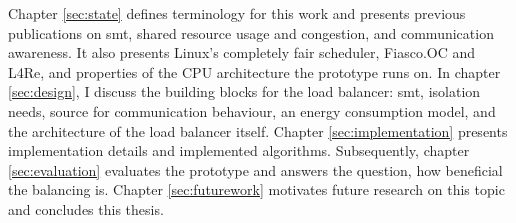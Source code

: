 Chapter \ref{sec:state} defines terminology for this work and presents previous
publications on \gls{smt}, shared resource usage and
congestion, and communication awareness.
It also presents Linux's completely fair scheduler, Fiasco.OC and L4Re, and
properties of the CPU architecture the prototype runs on.
In chapter \ref{sec:design}, I discuss the building blocks for the load
balancer: \gls{smt}, isolation needs, source for communication behaviour, an energy
consumption model, and the architecture of the load balancer itself.
Chapter \ref{sec:implementation} presents implementation details and
implemented algorithms.
Subsequently, chapter \ref{sec:evaluation} evaluates the prototype and answers
the question, how beneficial the balancing is.
Chapter \ref{sec:futurework} motivates future research on this topic and
concludes this thesis.


\cleardoublepage

